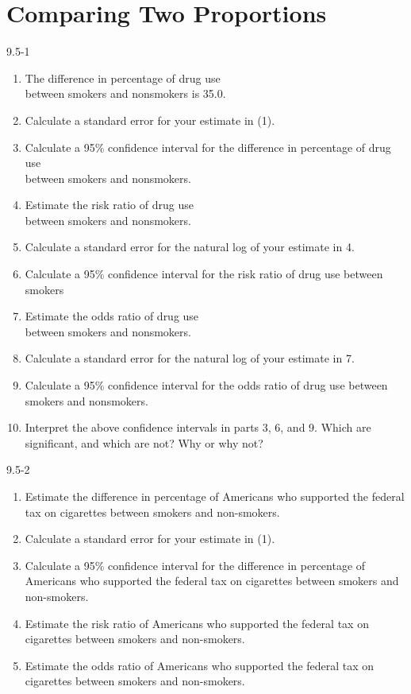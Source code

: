 \setcounter{chapter}{9}\chapter{Comparing Two Proportions }
\begin{exsol@solution}{9.5-1}


\begin{enumerate}
\item The difference in percentage of  drug  use \\ between smokers and nonsmokers is 35.0.
\item Calculate a standard error for your estimate in (1).
\item Calculate a 95\% confidence interval for the difference in percentage of drug use \\ between smokers and nonsmokers.
\item Estimate the risk ratio of drug use \\ between smokers and nonsmokers.
\item Calculate a standard error for the natural log of your estimate in 4.
\item Calculate a 95\% confidence interval for the risk ratio of drug use between smokers
\item Estimate the odds ratio of drug use \\ between smokers and nonsmokers.
\item Calculate a standard error for the natural log of your estimate in 7.
\item Calculate a 95\% confidence interval for the odds ratio of drug use between smokers and nonsmokers.
\item Interpret the above confidence intervals in parts 3, 6, and 9. Which are significant, and which are not? Why or why not?
\end{enumerate}

\end{exsol@solution}
\begin{exsol@solution}{9.5-2}
		  \begin{enumerate}
	  \item Estimate the difference in percentage of Americans who supported the federal tax on cigarettes between smokers and non-smokers.
    \item Calculate a standard error for your estimate in (1).
    \item Calculate a 95\% confidence interval for the difference in percentage of Americans who supported the federal tax on cigarettes between smokers and non-smokers.
    \item Estimate the risk ratio of Americans who supported the federal tax on cigarettes between smokers and non-smokers.
    \item Estimate the odds ratio of Americans who supported the federal tax on cigarettes between smokers and non-smokers.
	  \end{enumerate}

\end{exsol@solution}
